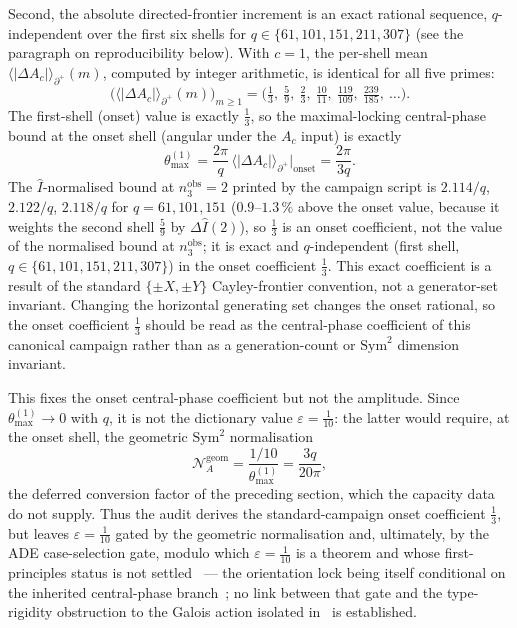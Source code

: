 \documentclass[11pt]{article}
\providecommand{\Sym}{\mathrm{Sym}}
\providecommand{\Ihat}{\widehat{I}}
\begin{document}
      Second, the absolute directed-frontier increment is an exact rational sequence, $q$-independent over the first six shells for $q\in\{61,101,151,211,307\}$ (see the paragraph on reproducibility below).
      With $c=1$, the per-shell mean $\langle|\Delta A_c|\rangle_{\partial^+}(m)$, computed by integer arithmetic, is
      identical for all five primes:
      \[
        \big(\langle|\Delta A_c|\rangle_{\partial^+}(m)\big)_{m\ge 1}
        = \Big( \tfrac13,\ \tfrac59,\ \tfrac23,\ \tfrac{10}{11},\ \tfrac{119}{109},\ \tfrac{239}{185},\ \dots \Big).
      \]
      The first-shell (onset) value is exactly $\tfrac13$, so the maximal-locking central-phase bound at the onset
      shell (angular under the $A_c$ input) is exactly
      \[
        \theta_{\max}^{(1)}
        = \frac{2\pi}{q}\,\langle|\Delta A_c|\rangle_{\partial^+}\big|_{\mathrm{onset}}
        = \frac{2\pi}{3q}.
      \]
      The $\Ihat$-normalised bound at $n_3^{\mathrm{obs}}=2$ printed by the campaign script is $2.114/q$, $2.122/q$,
      $2.118/q$ for $q=61,101,151$ ($0.9$--$1.3\,\%$ above the onset value, because it weights the second shell
      $\tfrac59$ by $\Delta\Ihat(2)$), so $\tfrac13$ is an onset coefficient, not the value of the normalised bound at
      $n_3^{\mathrm{obs}}$; it is exact and $q$-independent (first shell, $q\in\{61,101,151,211,307\}$) in the onset coefficient $\tfrac13$.
      This exact coefficient is a result of the standard $\{\pm X,\pm Y\}$ Cayley-frontier convention, not a
      generator-set invariant.
      Changing the horizontal generating set changes the onset rational, so the onset coefficient $\tfrac13$ should be
      read as the central-phase coefficient of this canonical campaign rather than as a generation-count or $\Sym^2$
      dimension invariant.

      This fixes the onset central-phase coefficient but not the amplitude.
      Since $\theta_{\max}^{(1)}\to 0$ with $q$, it is not the dictionary value $\varepsilon=\tfrac1{10}$: the latter would
      require, at the onset shell, the geometric $\Sym^2$ normalisation
      \[
        \mathcal{N}_A^{\mathrm{geom}}
        = \frac{1/10}{\theta_{\max}^{(1)}}
        = \frac{3q}{20\pi},
      \]
      the deferred conversion factor of the preceding section, which the capacity data do not supply.
      Thus the audit derives the standard-campaign onset coefficient $\tfrac13$, but leaves $\varepsilon=\tfrac1{10}$
      gated by the geometric normalisation and, ultimately, by the ADE case-selection gate, modulo which
      $\varepsilon=\tfrac1{10}$ is a theorem and whose first-principles status is not settled~\cite{Beau2026aog}
      --- the orientation lock being itself conditional on the inherited central-phase
      branch~\cite{Beau2026cho}; no link between that gate and the type-rigidity obstruction to the Galois action
      isolated in~\cite{Beau2026aog} is established.
\end{document}
